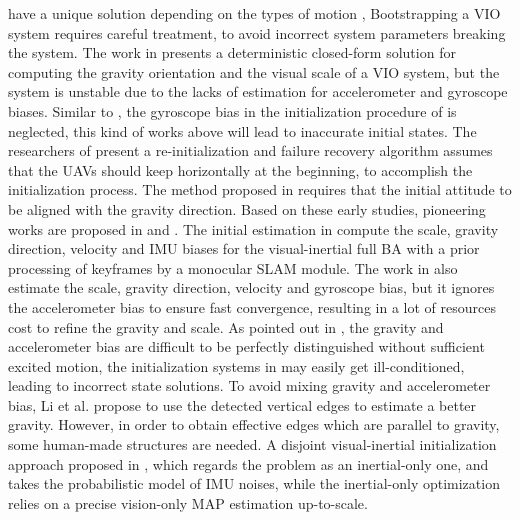 \documentclass[journal,article,submit,moreauthors,pdftex]{Definitions/mdpi}
\begin{document}
have a unique solution depending on the types of motion 
\cite{martinelliClosedFormSolutionVisualInertial2014}, 
Bootstrapping a VIO system requires careful treatment, to avoid 
incorrect system parameters breaking the system. 
The work in \cite{kneipDeterministicInitializationMetric2011} 
presents a deterministic closed-form solution for computing the 
gravity orientation and the visual scale of a VIO system, but the 
system is unstable due to the lacks of estimation for accelerometer 
and gyroscope biases. 
Similar to \cite{kneipDeterministicInitializationMetric2011}, the 
gyroscope bias in the initialization procedure of \cite{yangMonocularVisualInertial2017,martinelliClosedFormSolutionVisualInertial2014} 
is neglected, this kind of works above will lead to inaccurate 
initial states. 
The researchers of \cite{faesslerAutomaticReinitializationFailure2015} 
present a re-initialization and failure recovery algorithm assumes that 
the UAVs should keep horizontally at the beginning, to accomplish the 
initialization process. The method proposed in \cite{weissInertialOpticalFlow2015} 
requires that the initial attitude to be aligned with the
gravity direction. Based on these early studies, pioneering works are 
proposed in \cite{mur-artalVisualInertialMonocularSLAM2017a} and 
\cite{qinRobustInitializationMonocular2017}. The initial estimation 
in \cite{mur-artalVisualInertialMonocularSLAM2017a} compute the scale, 
gravity direction, velocity and IMU biases for the visual-inertial 
full BA with a prior processing of keyframes by a monocular SLAM module. 
The work in \cite{qinRobustInitializationMonocular2017} also estimate 
the scale, gravity direction, velocity and gyroscope bias, but it 
ignores the accelerometer bias to ensure fast convergence, resulting 
in a lot of resources cost to refine the gravity and scale. 
As pointed out in \cite{martinelliClosedFormSolutionVisualInertial2014}, 
the gravity and accelerometer bias are difficult to be perfectly 
distinguished without sufficient excited motion, the initialization 
systems in \cite{mur-artalVisualInertialMonocularSLAM2017a,qinRobustInitializationMonocular2017} 
may easily get ill-conditioned, leading to incorrect state solutions. 
To avoid mixing gravity and accelerometer bias, Li et al. 
\cite{liRapidRobustMonocular2019} propose to use the detected vertical 
edges to estimate a better gravity. 
However, in order to obtain effective edges which are parallel to 
gravity, some human-made structures are needed.
A disjoint visual-inertial initialization approach proposed in \cite{camposInertialOnlyOptimizationVisualInertial2020}, 
which regards the problem as an inertial-only one, and takes 
the probabilistic model of IMU noises, while the inertial-only 
optimization relies on a precise vision-only MAP estimation 
up-to-scale.
\end{document}
